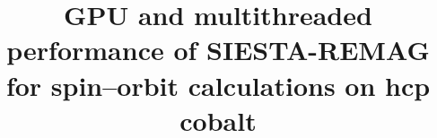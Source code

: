 

\title{GPU and multithreaded performance of SIESTA-REMAG\\for spin--orbit calculations on hcp cobalt}
\author{}
\date{}

\maketitle












